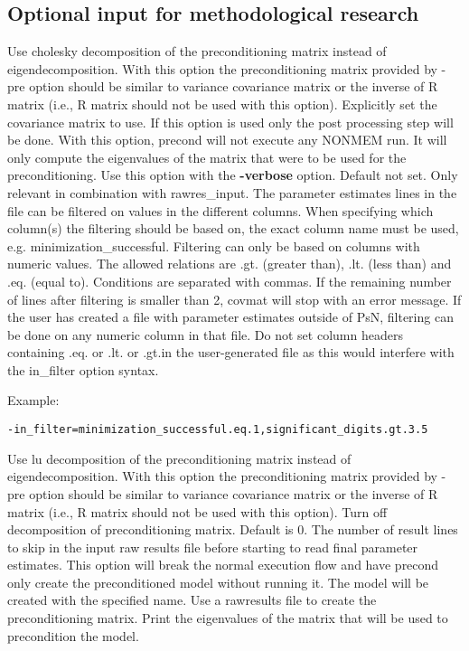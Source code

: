 \subsection{Optional input for methodological research}

\begin{optionlist}
Use cholesky decomposition of the preconditioning matrix instead of eigendecomposition.  With this option the preconditioning matrix provided by -pre option should be similar to variance covariance matrix or the inverse of R matrix  (i.e., R matrix should not be used with this option).
\nextopt
{}
Explicitly set the covariance matrix to use. If this option is used only the post processing step will be done.
\nextopt
{}
With this option, precond will not execute any NONMEM run. It will only compute the eigenvalues of the matrix that were to be used for the preconditioning. Use this option with the {\bf-verbose} option.
\nextopt
{}
Default not set. Only relevant in combination with rawres\_input. The parameter estimates lines in the file can be filtered on values in the different columns. When specifying which column(s) the filtering should be based on, the exact column name must be used, e.g. minimization\_successful. Filtering can only be based on columns with numeric values. The allowed relations are .gt. (greater than), .lt. (less than) and .eq. (equal to). Conditions are separated with commas. If the remaining number of lines after filtering is smaller than 2, covmat will stop with an error message. If the user has created a file with parameter estimates outside of PsN, filtering can be done on any numeric column in that file. Do not set column headers containing .eq. or .lt. or .gt.in the user-generated file as this would interfere with the in\_filter option syntax.

Example: 
\begin{verbatim}
-in_filter=minimization_successful.eq.1,significant_digits.gt.3.5
\end{verbatim}
\nextopt	
{}
Use lu decomposition of the preconditioning matrix instead of eigendecomposition. With this option the preconditioning matrix provided by -pre option should be similar to variance covariance matrix or the inverse of R matrix (i.e., R matrix should not be used with this option).
\nextopt
{}
Turn off decomposition of preconditioning matrix.
\nextopt
{}
Default is 0. The number of result lines to skip in the input raw results file before starting to read final parameter estimates.
\nextopt
{}
This option will break the normal execution flow and have precond only create the preconditioned model without running it.
The model will be created with the specified name.
\nextopt
{}
Use a rawresults file to create the preconditioning matrix.
\nextopt
{}
Print the eigenvalues of the matrix that will be used to precondition the model.
\nextopt
\end{optionlist}

